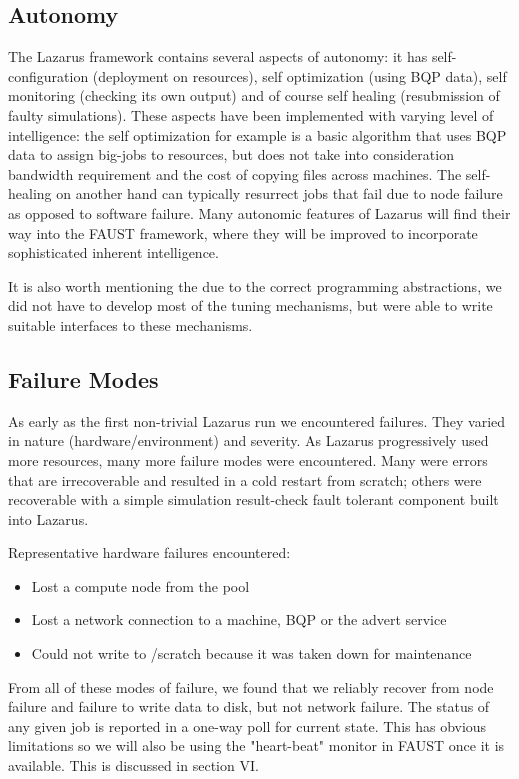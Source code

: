 \documentclass{sig-alternate}
\begin{document}
\subsection{Autonomy}
The Lazarus framework contains several aspects of autonomy: it has
self-configuration (deployment on resources), self optimization (using
BQP data), self monitoring (checking its own output) and of course
self healing (resubmission of faulty simulations). These aspects have
been implemented with varying level of intelligence: the self
optimization for example is a basic algorithm that uses BQP data to
assign big-jobs to resources, but does not take into consideration
bandwidth requirement and the cost of copying files across
machines. The self-healing on another hand can typically resurrect
jobs that fail due to node failure as opposed to software
failure. Many autonomic features of Lazarus will find their way into
the FAUST framework, where they will be improved to incorporate
sophisticated inherent intelligence.  

It is also worth mentioning the due to the correct programming
abstractions, we did not have to develop most of the tuning
mechanisms, but were able to write suitable interfaces to these
mechanisms.


\subsection{Failure Modes}
As early as the first non-trivial Lazarus run we encountered failures. They
varied in nature (hardware/environment) and severity. As Lazarus progressively
used more resources, many more failure modes were encountered.
Many were errors that are irrecoverable and resulted in a
cold restart from scratch; others were recoverable with a simple simulation 
result-check fault tolerant component built into Lazarus.

Representative hardware failures encountered:
\begin{itemize}
\item{Lost a compute node from the pool}
\item{Lost a network connection to a machine, BQP or the advert service}
\item{Could not write to /scratch because it was taken down for maintenance}
\end{itemize}
From all of these modes of failure, we found that we reliably recover
from node failure and failure to write data to disk, but not network
failure. The status of any given job is reported in a one-way poll for
current state. This has obvious limitations so we will also be using
the "heart-beat" monitor in FAUST once it is available. This is discussed
in section VI.
\end{document}
